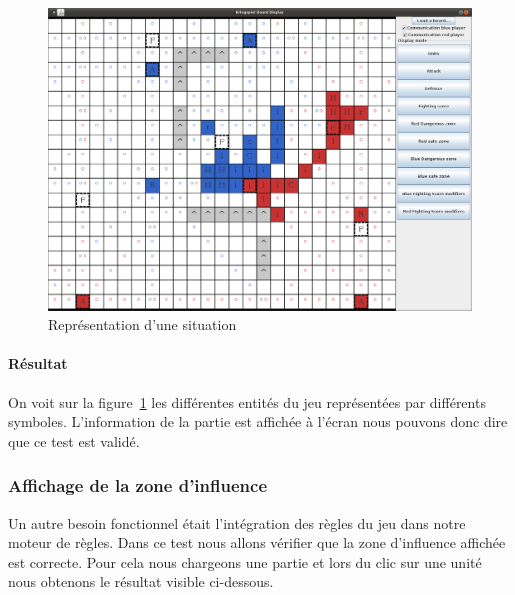 				\begin{figure}[!h]
				    \caption{Représentation d'une situation}
				    \centerline{\includegraphics[scale=0.35]{images/tests_fonctionnels/representation_situation.png}}
				    \label{fig:representation_situation}
				\end{figure}

				\paragraph{Résultat\\}
					On voit sur la figure~\ref{fig:representation_situation} les différentes entités du jeu représentées par différents symboles.
					L'information de la partie est affichée à l'écran nous pouvons donc dire que ce test est validé.


			\subsubsection{Affichage de la zone d'influence}
				Un autre besoin fonctionnel était l'intégration des règles du jeu dans notre moteur de règles. Dans ce test nous allons vérifier que la zone d'influence affichée est correcte. Pour cela nous chargeons une partie et lors du clic sur une unité nous obtenons le résultat visible ci-dessous.

